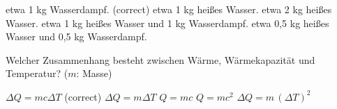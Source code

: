 \documentclass[11pt]{exam}
\begin{document}
\begin{questions}
\begin{choices}
	\choice etwa 1 kg Wasserdampf. (correct)
	\choice etwa 1 kg heißes Wasser.
	\choice etwa 2 kg heißes Wasser.
	\choice etwa 1 kg heißes Wasser und 1 kg Wasserdampf.
	\choice etwa 0,5 kg heißes Wasser und 0,5 kg Wasserdampf.
\end{choices}

\vspace{3mm}\question Welcher Zusammenhang besteht zwischen Wärme, Wärmekapazität und Temperatur? (\(m\): Masse)

\begin{choices}
	\choice \(\Delta Q = m c \Delta T\) (correct)
	\choice \(\Delta Q = m \Delta T\)
	\choice \(Q = m c\)
	\choice \(Q = m c^2\)
	\choice \(\Delta Q = m \, (\Delta T)^2\)
\end{choices}

\vspace{3mm}\end{questions}
\end{document}
